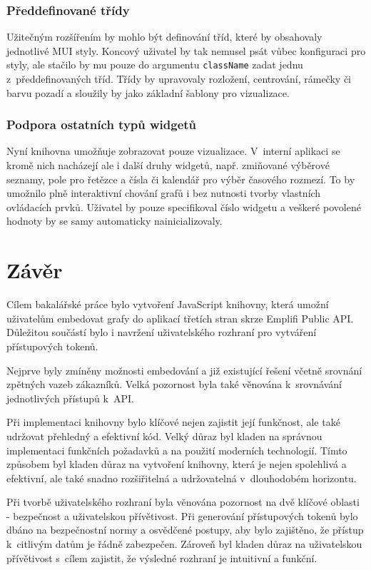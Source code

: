 \documentclass[czech, bc, kiv, he, iso690numb]{fasthesis}
\begin{document}
\subsection{Předdefinované třídy}
Užitečným rozšířením by mohlo být definování tříd, které by obsahovaly jednotlivé MUI styly. Koncový uživatel by tak nemusel psát vůbec konfiguraci pro styly,
ale stačilo by mu pouze do argumentu \texttt{className} zadat jednu z~předdefinovaných tříd. Třídy by upravovaly rozložení, centrování, rámečky či barvu pozadí a sloužily
by jako základní šablony pro vizualizace.

\subsection{Podpora ostatních typů widgetů}
Nyní knihovna umožňuje zobrazovat pouze vizualizace. V~interní aplikaci se kromě nich nacházejí ale i další druhy widgetů, např. zmiňované výběrové seznamy,
pole pro řetězce a čísla či kalendář pro výběr časového rozmezí. To by umožnilo plně interaktivní chování grafů i bez nutnosti tvorby vlastních ovládacích prvků.
Uživatel by pouze specifikoval číslo widgetu a veškeré povolené hodnoty by se samy automaticky nainicializovaly.


%
%
%
%
\chapter{Závěr}
Cílem bakalářské práce bylo vytvoření JavaScript knihovny, která umožní uživatelům embedovat grafy do aplikací třetích stran skrze
Emplifi Public API. Důležitou součástí bylo i navržení uživatelského rozhraní pro vytváření přístupových tokenů.

Nejprve byly zmíněny možnosti embedování a již existující řešení včetně srovnání zpětných vazeb zákazníků. Velká pozornost byla také
věnována k~srovnávání jednotlivých přístupů k~API.

Při implementaci knihovny bylo klíčové nejen zajistit její funkčnost, ale také udržovat přehledný a efektivní kód.
Velký důraz byl kladen na správnou implementaci funkčních požadavků a na použití moderních technologií. 
Tímto způsobem byl kladen důraz na vytvoření knihovny, která je nejen spolehlivá a efektivní, ale také snadno rozšiřitelná a udržovatelná v~dlouhodobém horizontu.

Při tvorbě uživatelského rozhraní byla věnována pozornost na dvě klíčové oblasti - bezpečnost a uživatelskou přívětivost. Při generování přístupových tokenů bylo dbáno na
bezpečnostní normy a osvědčené postupy, aby bylo zajištěno, že přístup k~citlivým datům je řádně zabezpečen. 
Zároveň byl kladen důraz na uživatelskou přívětivost s~cílem zajistit, že výsledné rozhraní je intuitivní a funkční.
\end{document}
